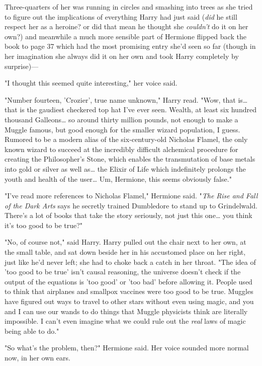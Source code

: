 Three-quarters of her was running in circles and smashing into trees as she 
tried to figure out the implications of everything Harry had just said 
(\emph{did} he still respect her as a heroine? or did that mean he thought she 
\emph{couldn't} do it on her own?) and meanwhile a much more sensible part of 
Hermione flipped back the book to page 37 which had the most promising entry 
she'd seen so far (though in her imagination she always did it on her own and 
took Harry completely by surprise)---

"I thought this seemed quite interesting," her voice said.

"Number fourteen, 'Crozier', true name unknown," Harry read. "Wow, that 
is{\ldots} that is the gaudiest checkered top hat I've ever seen. Wealth, at 
least six hundred thousand Galleons{\ldots} so around thirty million pounds, 
not enough to make a Muggle famous, but good enough for the smaller wizard 
population, I guess. Rumored to be a modern alias of the six-century-old 
Nicholas Flamel, the only known wizard to succeed at the incredibly difficult 
alchemical procedure for creating the Philosopher's Stone, which enables the 
transmutation of base metals into gold or silver as well as{\ldots} the Elixir 
of Life which indefinitely prolongs the youth and health of the user{\ldots} 
Um, Hermione, this seems obviously false."

"I've read more references to Nicholas Flamel," Hermione said. "\emph{The Rise 
and Fall of the Dark Arts} says he secretly trained Dumbledore to stand up to 
Grindelwald. There's a lot of books that take the story seriously, not just 
this one{\ldots} you think it's too good to be true?"

"No, of course not," said Harry. Harry pulled out the chair next to her own, at 
the small table, and sat down beside her in his accustomed place on her right, 
just like he'd never left; she had to choke back a catch in her throat. "The 
idea of 'too good to be true' isn't causal reasoning, the universe doesn't 
check if the output of the equations is 'too good' or 'too bad' before allowing 
it. People used to think that airplanes and smallpox vaccines were too good to 
be true. Muggles have figured out ways to travel to other stars without even 
using magic, and you and I can use our wands to do things that Muggle 
physicists think are literally impossible. I can't even imagine what we could 
rule out the \emph{real} laws of magic being able to do."

"So what's the problem, then?" Hermione said. Her voice sounded more normal 
now, in her own ears.

